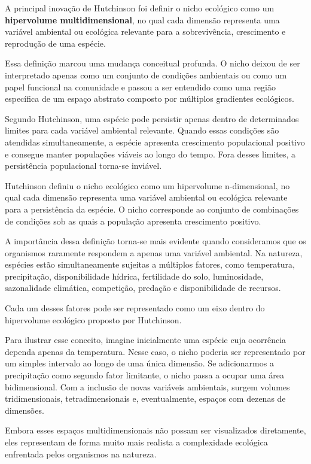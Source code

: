 A principal inovação de Hutchinson foi definir o nicho ecológico como um \textbf{hipervolume multidimensional}, no qual cada dimensão representa uma variável ambiental ou ecológica relevante para a sobrevivência, crescimento e reprodução de uma espécie.

Essa definição marcou uma mudança conceitual profunda. O nicho deixou de ser interpretado apenas como um conjunto de condições ambientais ou como um papel funcional na comunidade e passou a ser entendido como uma região específica de um espaço abstrato composto por múltiplos gradientes ecológicos.

Segundo Hutchinson, uma espécie pode persistir apenas dentro de determinados limites para cada variável ambiental relevante. Quando essas condições são atendidas simultaneamente, a espécie apresenta crescimento populacional positivo e consegue manter populações viáveis ao longo do tempo. Fora desses limites, a persistência populacional torna-se inviável.

\begin{conceito}
	Hutchinson definiu o nicho ecológico como um hipervolume n-dimensional, no qual cada dimensão representa uma variável ambiental ou ecológica relevante para a persistência da espécie. O nicho corresponde ao conjunto de combinações de condições sob as quais a população apresenta crescimento positivo.
\end{conceito}

A importância dessa definição torna-se mais evidente quando consideramos que os organismos raramente respondem a apenas uma variável ambiental. Na natureza, espécies estão simultaneamente sujeitas a múltiplos fatores, como temperatura, precipitação, disponibilidade hídrica, fertilidade do solo, luminosidade, sazonalidade climática, competição, predação e disponibilidade de recursos.

Cada um desses fatores pode ser representado como um eixo dentro do hipervolume ecológico proposto por Hutchinson.

Para ilustrar esse conceito, imagine inicialmente uma espécie cuja ocorrência dependa apenas da temperatura. Nesse caso, o nicho poderia ser representado por um simples intervalo ao longo de uma única dimensão. Se adicionarmos a precipitação como segundo fator limitante, o nicho passa a ocupar uma área bidimensional. Com a inclusão de novas variáveis ambientais, surgem volumes tridimensionais, tetradimensionais e, eventualmente, espaços com dezenas de dimensões.

Embora esses espaços multidimensionais não possam ser visualizados diretamente, eles representam de forma muito mais realista a complexidade ecológica enfrentada pelos organismos na natureza.

